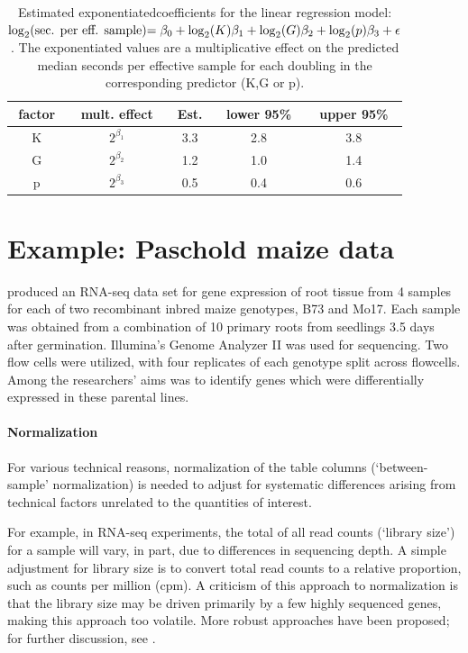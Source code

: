 {\begin{table}
\caption[Estimated exponentiated coefficients for the linear regression model: (model)]{\small Estimated exponentiatedcoefficients for the linear regression model: \\\hspace{\textwidth}\(\log_2$(sec. per eff. sample)$=\beta_0 + \log_2(K)\beta_1 + \log_2(G)\beta_2 + \log_2(p)\beta_3 + \epsilon\). The exponentiated values are a multiplicative effect on the predicted median seconds per effective sample for each doubling in the corresponding predictor (K,G or p).}
\vspace{0.5cm}
\label{tab:regression}
\centering
\begin{tabular}{ccccc}
  \hline
factor &mult. effect& Est. & lower 95\% & upper 95\% \\ 
  \hline
K & $2^{\beta_1}$ & 3.3 & 2.8 & 3.8 \\ 
G & $2^{\beta_2}$ & 1.2 & 1.0 & 1.4 \\ 
p & $2^{\beta_3}$ & 0.5 & 0.4 & 0.6 \\ 
   \hline
\end{tabular}
\end{table}


\section{Example: Paschold maize data}
\label{sec:analysis}
\citet{paschold} produced an RNA-seq data set for gene expression of root tissue from 4 samples for each of two recombinant inbred maize genotypes, B73 and Mo17. Each sample was obtained from a combination of 10 primary roots from seedlings 3.5 days after germination. Illumina's Genome Analyzer II was used for sequencing. Two flow cells were utilized, with four replicates of each genotype split across flowcells. Among the researchers' aims was to identify genes which were differentially expressed in these parental lines.

\paragraph{Normalization} For various technical reasons, normalization of the table columns (`between-sample' normalization) is needed to adjust for systematic differences arising from technical factors unrelated to the quantities of interest.

For example, in RNA-seq experiments, the total of all read counts (`library size') for a sample will vary, in part, due to differences in sequencing depth. A simple adjustment for library size is to convert total read counts to a relative proportion, such as counts per million (cpm). A criticism of this approach to normalization is that the library size may be driven primarily by a few highly sequenced genes, making this approach too volatile. More robust approaches have been proposed; for further discussion, see \citet{oshlack2010rna}.

}
